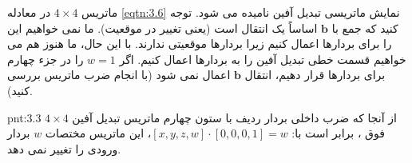 {\begin{spacing}{1.5}
        ماتریس $4\times 4$ در معادله \ref{eqtn:3.6} نمایش ماتریسی تبدیل آفین نامیده می شود.
        توجه کنید که جمع با $\textbf{b}$ اساساً یک انتقال است (یعنی تغییر در موقعیت).
        ما نمی خواهیم این را برای بردارها اعمال کنیم زیرا بردارها موقعیتی ندارند.
        با این حال، ما هنوز هم می خواهیم قسمت خطی تبدیل آفین را به بردارها اعمال کنیم.
        اگر $w=1$ را در جزء چهارم برای بردارها قرار دهیم، انتقال $\textbf{b}$ اعمال نمی شود (با انجام ضرب ماتریس بررسی کنید).

        \begin{point}{pnt:3.3}
            \Large
            از آنجا که ضرب داخلی بردار ردیف با ستون چهارم ماتریس تبدیل آفین $4\times 4$ فوق ، برابر است با:
            $[x, y, z, w]\cdot[0,0,0,1]=w$، این ماتریس مختصات $w$ بردار ورودی را تغییر نمی دهد.
        \end{point}
    \end{spacing}
}

